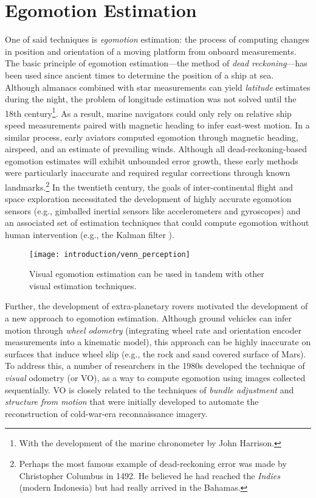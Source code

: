 \section{Egomotion Estimation}
One of said techniques is \textit{egomotion} estimation: the process of computing changes in position and orientation of a moving platform from onboard measurements.  The basic principle of egomotion estimation---the method of \textit{dead reckoning}---has been used since ancient times to determine the position of a ship at sea. Although almanacs combined with star measurements can yield \textit{latitude} estimates during the night, the problem of longitude estimation was not solved until the 18th century\footnote{With the development of the marine chronometer by John Harrison.}. As a result, marine navigators could only rely on relative ship speed measurements paired with magnetic heading to infer east-west motion. In a similar process, early aviators computed egomotion through magnetic heading, airspeed, and an estimate of prevailing winds. Although all dead-reckoning-based egomotion estimates will exhibit unbounded error growth, these early methods were particularly inaccurate and required regular corrections through known landmarks.\footnote{Perhaps the most famous example of dead-reckoning error was made by Christopher Columbus in 1492. He believed he had reached the \textit{Indies} (modern Indonesia) but had really arrived in the Bahamas.} In the twentieth century, the goals of inter-continental flight and space exploration necessitated the development of highly accurate egomotion sensors (e.g., gimballed inertial sensors like accelerometers and gyroscopes) and an associated set of estimation techniques that could compute egomotion without human intervention (e.g., the Kalman filter \citep{Grewal2010-ts}).

\begin{wrapfigure}{r}{0.5\textwidth}
	\centering
	\texttt{[image: introduction/venn\_perception]}
	\caption{Visual egomotion estimation can be used in tandem with other visual estimation techniques.}
	\label{fig:intro_state_venn}
	\vspace{-1.5em}
\end{wrapfigure}

Further, the development of extra-planetary rovers motivated the development of a new approach to egomotion estimation. Although ground vehicles can infer motion through \textit{wheel odometry} (integrating wheel rate and orientation encoder measurements into a kinematic model), this approach can be highly inaccurate on surfaces that induce wheel slip (e.g., the rock and sand covered surface of Mars). To address this, a number of researchers in the 1980s developed the technique of \textit{visual} odometry \citep{Scaramuzza2011-qr} (or VO), as a way to compute egomotion using images collected sequentially. VO is closely related to the techniques of \textit{bundle adjustment} \citep{triggs_bundle_2000} and \textit{structure from motion} that were initially developed to automate the reconstruction of cold-war-era reconnaissance imagery.






